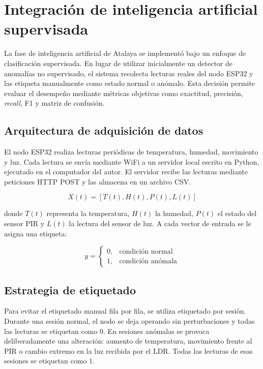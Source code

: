 \section{Integraci\'on de inteligencia artificial supervisada}

La fase de inteligencia artificial de Atalaya se implement\'o bajo un enfoque de clasificaci\'on supervisada. En lugar de utilizar inicialmente un detector de anomal\'ias no supervisado, el sistema recolecta lecturas reales del nodo ESP32 y las etiqueta manualmente como estado normal o an\'omalo. Esta decisi\'on permite evaluar el desempe\~no mediante m\'etricas objetivas como exactitud, precisi\'on, \textit{recall}, F1 y matriz de confusi\'on.

\subsection{Arquitectura de adquisici\'on de datos}

El nodo ESP32 realiza lecturas peri\'odicas de temperatura, humedad, movimiento y luz. Cada lectura se env\'ia mediante WiFi a un servidor local escrito en Python, ejecutado en el computador del autor. El servidor recibe las lecturas mediante peticiones HTTP POST y las almacena en un archivo CSV.

\begin{equation}
X(t) = [T(t), H(t), P(t), L(t)]
\end{equation}

donde $T(t)$ representa la temperatura, $H(t)$ la humedad, $P(t)$ el estado del sensor PIR y $L(t)$ la lectura del sensor de luz. A cada vector de entrada se le asigna una etiqueta:

\begin{equation}
y =
\begin{cases}
0, & \text{condici\'on normal} \\
1, & \text{condici\'on an\'omala}
\end{cases}
\end{equation}

\subsection{Estrategia de etiquetado}

Para evitar el etiquetado manual fila por fila, se utiliza etiquetado por sesi\'on. Durante una sesi\'on normal, el nodo se deja operando sin perturbaciones y todas las lecturas se etiquetan como $0$. En sesiones an\'omalas se provoca deliberadamente una alteraci\'on: aumento de temperatura, movimiento frente al PIR o cambio extremo en la luz recibida por el LDR. Todas las lecturas de esas sesiones se etiquetan como $1$.

